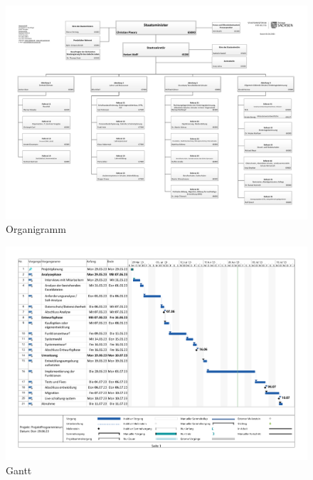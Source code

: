 
\begin{figure}[htb]
    \centering
    \includegraphics[angle=90, page=1,height=0.90\textheight, keepaspectratio]{anhang/abb/21_01_06_Organigramm_SMK.pdf}
    \caption[Organigramm des SMK]{Organigramm}
    \label{abb:Organigramm}
\end{figure}

\begin{figure}[htb]
    \centering
    \includegraphics[angle=90, page=1,height=0.90\textheight, keepaspectratio]{anhang/abb/ProjektProgrammierungZeitplan.pdf}
    \caption[Ganttdiagramm]{Gantt}
    \label{abb:Gantt}
\end{figure}

